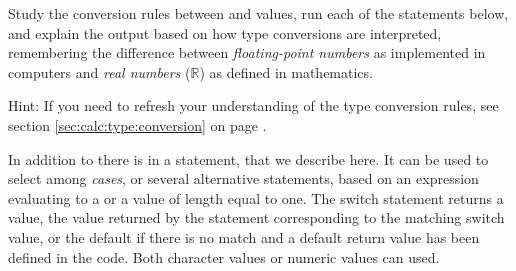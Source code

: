 \documentclass[krantz2]{krantz}\usepackage{knitr}%
\begin{document}
\begin{playground}
Study the conversion rules between  and  values, run each of the statements below, and explain the output based on how type conversions are interpreted, remembering the difference between \emph{floating-point numbers} as implemented in computers and \emph{real numbers} ($\mathbb{R}$) as defined in mathematics.

\begin{knitrout}\footnotesize
{}\color{fgcolor}\begin{kframe}
\begin{alltt}
 \hlstd{(}\hlstd{)} \hlstd{(}\hlstd{)}
 \hlstd{(}\hlopt{-}\hlstd{)} \hlstd{(}\hlstd{)}
 \hlstd{(}\hlstd{)} \hlstd{(}\hlstd{)}
 \hlstd{(}\hlstd{)} \hlstd{(}\hlstd{)}
 \hlstd{(}\hlstd{)} \hlstd{(}\hlstd{)}
 \hlstd{(}\hlstd{)} \hlstd{(}\hlstd{)}
 \hlstd{(}\hlstd{)} \hlstd{(}\hlstd{)}
 \hlstd{(}\hlstd{(}\hlstd{))} \hlstd{(}\hlstd{)}
 \hlstd{(}\hlstd{(}\hlstd{(}\hlstd{)))} \hlstd{(}\hlstd{)}
 \hlstd{(}\hlstd{(}\hlstd{))} \hlstd{(}\hlstd{)}
 \hlstd{(}\hlstd{)} \hlstd{(}\hlstd{)}
\end{alltt}
\end{kframe}
\end{knitrout}

Hint: If you need to refresh your understanding of the type conversion rules, see section \ref{sec:calc:type:conversion} on page \pageref{sec:calc:type:conversion}.
\end{playground}

In addition to  there is in  a  statement, that we describe here. It can be used to select among \emph{cases}, or several alternative statements, based on an expression evaluating to a  or a  value of length equal to one. The switch statement returns a value, the value returned by the statement corresponding to the matching switch value, or the default if there is no match and a default return value has been defined in the code. Both character values or numeric values can used.
\end{document}
